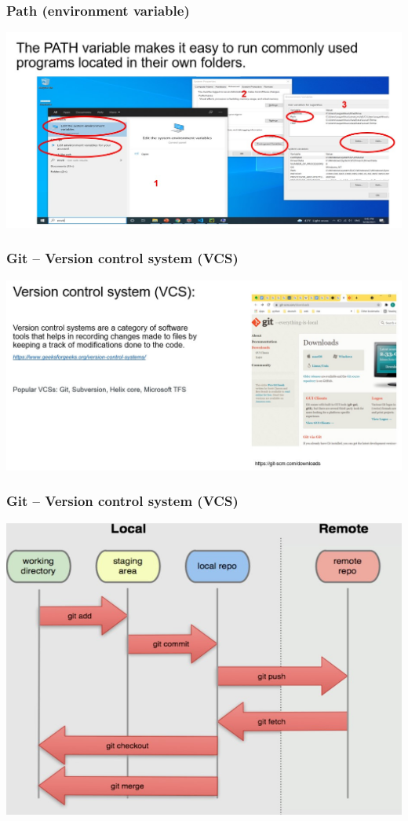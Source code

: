 \documentclass{beamer}
\begin{document}
\begin{frame}
    \frametitle{Path (environment variable)}
    \centering
    \includegraphics[scale = 0.5]{figures/path.jpg}
\end{frame}


\begin{frame}
    \frametitle{Git – Version control system (VCS)}
    \centering
    \includegraphics[scale = 0.35]{figures/git.jpg}
\end{frame}

\begin{frame}
    \frametitle{Git – Version control system (VCS)}
    \centering
    \includegraphics[scale = 0.5]{figures/git_flow.jpg}
\end{frame}
\end{document}

